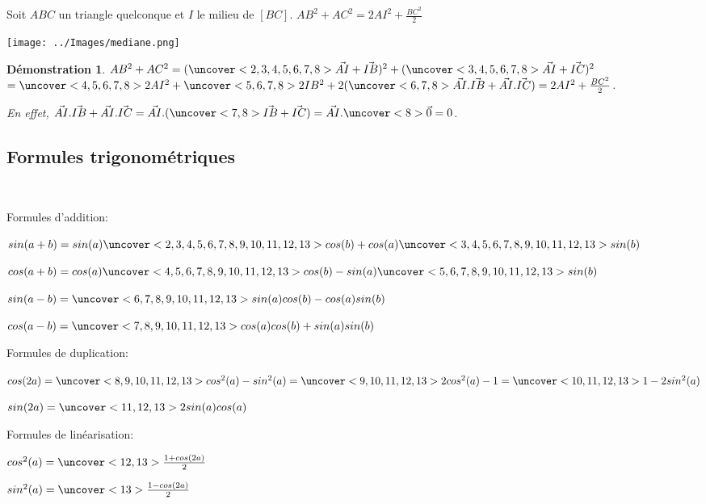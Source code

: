 \documentclass{beamer}
\theoremstyle{plain}
\newtheorem{demonstration}[theorem]{Démonstration}
\begin{document}
\begin{frame}
\begin{theorem}
 Soit $ABC$ un triangle quelconque et $I$ le milieu de $[BC]$. $AB^2+AC^2=2AI^2+\frac{BC^2}{2}$
 
   \begin{center}
    \texttt{[image: ../Images/mediane.png]}
  \end{center}
\end{theorem}

\begin{demonstration}
 $AB^2+AC^2=(\uncover<2,3,4,5,6,7,8>{\vec{AI}+\vec{IB}})^2+(\uncover<3,4,5,6,7,8>{\vec{AI}+\vec{IC}})^2$
 $= \uncover<4,5,6,7,8>{2AI^2}+\uncover<5,6,7,8>{2IB^2}+
 2(\uncover<6,7,8>{\vec{AI}.\vec{IB}+\vec{AI}.\vec{IC}})=
 2AI^2+\frac{BC^2}{2}$. 
 
 En effet, $\vec{AI}.\vec{IB}+\vec{AI}.\vec{IC}=\vec{AI}.(\uncover<7,8>{\vec{IB}+\vec{IC}})=
 \vec{AI}.\uncover<8>{\vec{0}}=0$.
\end{demonstration}
\end{frame}


\subsection{Formules trigonométriques}

\begin{frame}
\begin{theorem}
~

 Formules d'addition:
 
 $sin(a+b)=sin(a)\uncover<2,3,4,5,6,7,8,9,10,11,12,13>{cos(b)}+cos(a)\uncover<3,4,5,6,7,8,9,10,11,12,13>{sin(b)}$
 
 $cos(a+b)=cos(a)\uncover<4,5,6,7,8,9,10,11,12,13>{cos(b)}-sin(a)\uncover<5,6,7,8,9,10,11,12,13>{sin(b)}$
 
 $sin(a-b)=\uncover<6,7,8,9,10,11,12,13>{sin(a)cos(b)-cos(a)sin(b)}$
  
 $cos(a-b)=\uncover<7,8,9,10,11,12,13>{cos(a)cos(b)+sin(a)sin(b)}$
 \vspace{0.5cm}
 
 Formules de duplication:
 
 $cos(2a)=\uncover<8,9,10,11,12,13>{cos^2(a)-sin^2(a)}
 =\uncover<9,10,11,12,13>{2cos^2(a)-1}
 =\uncover<10,11,12,13>{1-2sin^2(a)}$
 
 $sin(2a)=\uncover<11,12,13>{2sin(a)cos(a)}$
 \vspace{0.5cm}
 
 Formules de linéarisation:
 
 $cos^2(a)=\uncover<12,13>{\frac{1+cos(2a)}{2}}$
 
 $sin^2(a)=\uncover<13>{\frac{1-cos(2a)}{2}}$
\end{theorem}
\end{frame}
  \iffalse

\fi
   
 
  
\end{document}
